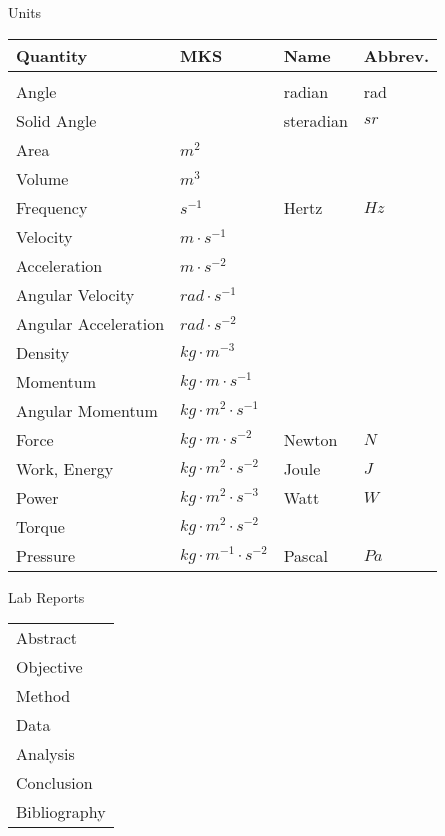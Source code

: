 %
%
%

\begin{section}{Units}
  \begin{tabular}{l l l l}
    Quantity & MKS & Name & Abbrev.\\
    \hline \\
    Angle &  & radian & rad \\
    Solid Angle & & steradian & $sr$ \\
    Area & $m^2$ & & \\
    Volume & $m^3$ & & \\
    Frequency & $s^{-1}$ & Hertz & $Hz$\\
    Velocity & $m \cdot s^{-1}$ & & \\
    Acceleration & $m \cdot s^{-2}$ & & \\
    Angular Velocity & $rad \cdot s^{-1}$ & & \\
    Angular Acceleration & $rad \cdot s^{-2}$  & & \\
    Density & $kg \cdot m^{-3}$ & & \\
    Momentum & $kg \cdot m \cdot s^{-1}$  & & \\
    Angular Momentum & $kg \cdot m^2 \cdot s^{-1}$ & & \\
    Force & $kg \cdot m \cdot s^{-2}$ & Newton & $N$ \\
    Work, Energy & $kg \cdot m^2 \cdot s^{-2}$ & Joule & $J$ \\
    Power & $kg \cdot m^2 \cdot s^{-3}$ & Watt & $W$ \\
    Torque & $kg \cdot m^2 \cdot s^{-2}$ & & \\
    Pressure & $kg \cdot m^{-1} \cdot s^{-2}$  & Pascal & $Pa$ \\
  \end{tabular}
\end{section}
\begin{section}{Lab Reports}
  \begin{tabular}{l}
    Abstract\\
    Objective\\
    Method\\
    Data\\
    Analysis\\
    Conclusion\\
    Bibliography\\
  \end{tabular}
\end{section}
